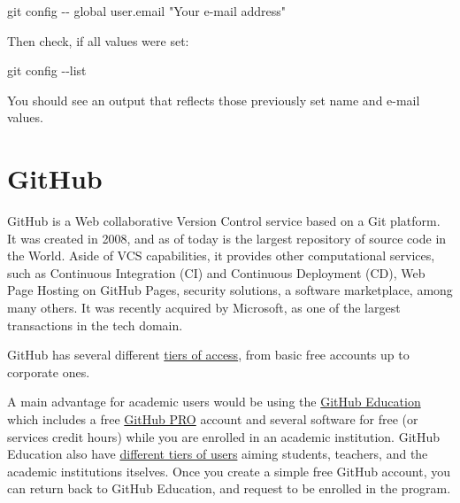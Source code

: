 \documentclass[
]{book}
\newenvironment{Shaded}{\begin{snugshade}}{\end{snugshade}}
\newcommand{\AttributeTok}[1]{\textcolor[rgb]{0.77,0.63,0.00}{#1}}
\newcommand{\FunctionTok}[1]{\textcolor[rgb]{0.00,0.00,0.00}{#1}}
\newcommand{\NormalTok}[1]{#1}
\newcommand{\StringTok}[1]{\textcolor[rgb]{0.31,0.60,0.02}{#1}}
\begin{document}
\begin{Shaded}
\begin{Highlighting}[]
\FunctionTok{git}\NormalTok{ config }\AttributeTok{{-}{-}}\NormalTok{ global user.email }\StringTok{"Your e{-}mail address"}
\end{Highlighting}
\end{Shaded}

Then check, if all values were set:

\begin{Shaded}
\begin{Highlighting}[]
\FunctionTok{git}\NormalTok{ config }\AttributeTok{{-}{-}list}
\end{Highlighting}
\end{Shaded}

You should see an output that reflects those previously set name and e-mail values.

\hypertarget{github}{%
\section{GitHub}\label{github}}

GitHub is a Web collaborative Version Control service based on a Git platform. It was
created in 2008, and as of today is the largest repository of source code in the World.
Aside of VCS capabilities, it provides other computational services, such as
Continuous Integration (CI) and Continuous Deployment (CD), Web Page Hosting on GitHub
Pages, security solutions, a software marketplace, among many others. It was recently
acquired by Microsoft, as one of the largest transactions in the tech domain.

GitHub has several different \href{https://docs.github.com/en/get-started/learning-about-github/githubs-products\#about-githubs-products}{tiers of access},
from basic free accounts up to corporate ones.

A main advantage for academic users would be using the \href{https://education.github.com}{GitHub Education} which includes a free \href{https://docs.github.com/en/get-started/learning-about-github/githubs-products\#github-pro}{GitHub PRO}
account and several software for free (or services credit hours) while you are
enrolled in an academic institution. GitHub Education also have \href{https://education.github.com/benefits}{different tiers of users}
aiming students, teachers, and the academic institutions itselves. Once you
create a simple free GitHub account, you can return back to GitHub Education,
and request to be enrolled in the program.
\end{document}
